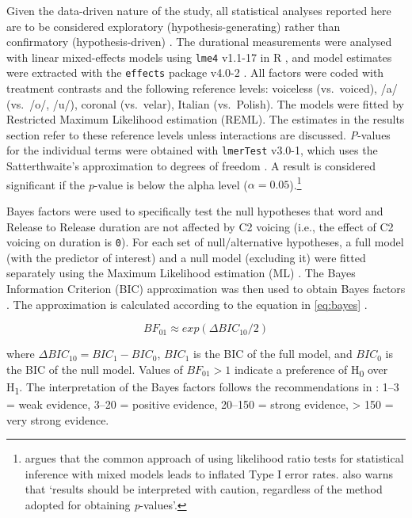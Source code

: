 \documentclass[12pt,]{article}
\let\rmarkdownfootnote\footnote%
\def\footnote{\protect\rmarkdownfootnote}
\begin{document}
Given the data-driven nature of the study, all statistical analyses
reported here are to be considered exploratory (hypothesis-generating)
rather than confirmatory (hypothesis-driven)
\citep{kerr1998, gelman2013, roettger2018}. The durational measurements
were analysed with linear mixed-effects models using \texttt{lme4}
v1.1-17 in R \citep{bates2015}, and model estimates were extracted with
the \texttt{effects} package v4.0-2 \citep{fox2003}. All factors were
coded with treatment contrasts and the following reference levels:
voiceless (vs.~voiced), /a/ (vs.~/o/, /u/), coronal (vs.~velar), Italian
(vs.~Polish). The models were fitted by Restricted Maximum Likelihood
estimation (REML). The estimates in the results section refer to these
reference levels unless interactions are discussed. \emph{P}-values for
the individual terms were obtained with \texttt{lmerTest} v3.0-1, which
uses the Satterthwaite's approximation to degrees of freedom
\citep{kuznetsova2017, luke2017}. A result is considered significant if
the \emph{p}-value is below the alpha level
(\(\alpha = 0.05\)).\footnote{\citet{luke2017} argues that the common approach of using likelihood ratio tests for statistical inference with mixed models leads to inflated Type I error rates. \citet[1501]{luke2017} also warns that `results should be interpreted with caution, regardless of the method adopted for obtaining \textit{p}-values'.}

Bayes factors were used to specifically test the null hypotheses that
word and Release to Release duration are not affected by C2 voicing
(i.e., the effect of C2 voicing on duration is \texttt{0}). For each set
of null/alternative hypotheses, a full model (with the predictor of
interest) and a null model (excluding it) were fitted separately using
the Maximum Likelihood estimation (ML) \citep[p.~34]{bates2015}. The
Bayes Information Criterion (BIC) approximation was then used to obtain
Bayes factors
\citep{raftery1995, raftery1999, wagenmakers2007, jarosz2014}. The
approximation is calculated according to the equation in \ref{eq:bayes}
\citep[p.~796]{wagenmakers2007}.

\begin{equation}
\label{eq:bayes}
BF_{01} \approx exp(\Delta{}BIC_{10}/2)
\end{equation}

where \(\Delta{}BIC_{10} = BIC_1 - BIC_0\), \(BIC_1\) is the BIC of the
full model, and \(BIC_0\) is the BIC of the null model. Values of
\(BF_{01} > 1\) indicate a preference of H\textsubscript{0} over
H\textsubscript{1}. The interpretation of the Bayes factors follows the
recommendations in \citet[p.~139]{raftery1995}: 1--3 = weak evidence,
3--20 = positive evidence, 20--150 = strong evidence, \textgreater{} 150
= very strong evidence.
\end{document}
